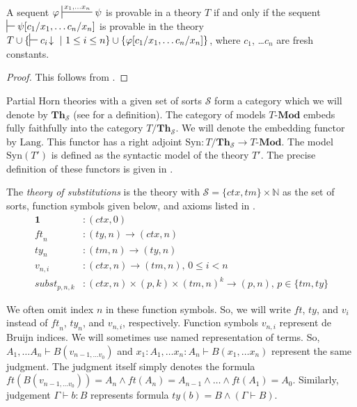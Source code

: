 \documentclass[reqno]{amsart}
\theoremstyle{definition}
\theoremstyle{remark}
\newcommand{\cat}[1]{\mathbf{#1}}
\newcommand{\Mod}[1]{#1\text{-}\cat{Mod}}
\newcommand{\Th}{\cat{Th}}
\newcommand{\emptyCtx}{\mathbf{1}}
\newcommand{\Syn}{\mathrm{Syn}}
\newcommand{\Lang}{\mathrm{Lang}}
\newcommand{\subst}{\mathit{subst}}
\newcommand{\ft}{\mathit{ft}}
\newcommand{\ty}{\mathit{ty}}
\newcommand{\ctx}{\mathit{ctx}}
\newcommand{\tm}{\mathit{tm}}
\numberwithin{figure}{section}
\begin{document}
\begin{lem}[mcf]
A sequent $\varphi \sststile{}{x_1, \ldots x_n} \psi$ is provable in a theory $T$ if and only if
the sequent $\sststile{}{} \psi[c_1/x_1, \ldots c_n/x_n]$ is provable in the theory $T \cup \{ \sststile{}{} c_i\!\downarrow\ |\ 1 \leq i \leq n \} \cup \{ \varphi[c_1/x_1, \ldots c_n/x_n] \}$,
where $c_1$, \ldots $c_n$ are fresh constants.
\end{lem}
\begin{proof}
This follows from \cite[Theorem~10, Theorem~11]{PHL}.
\end{proof}

Partial Horn theories with a given set of sorts $\mathcal{S}$ form a category which we will denote by $\Th_\mathcal{S}$ (see \cite[Section~2]{alg-tt} for a definition).
The category of models $\Mod{T}$ embeds fully faithfully into the category $T/\Th_\mathcal{S}$.
We will denote the embedding functor by $\Lang$.
This functor has a right adjoint $\Syn : T/\Th_\mathcal{S} \to \Mod{T}$.
The model $\Syn(T')$ is defined as the syntactic model of the theory $T'$.
The precise definition of these functors is given in \cite[Section~4.1]{alg-models}.

The \emph{theory of substitutions} is the theory with $\mathcal{S} = \{ \ctx, \tm \} \times \mathbb{N}$ as the set of sorts, function symbols given below, and axioms listed in \cite[Section~3.1]{alg-tt}.
\begin{align*}
\emptyCtx      & : (\ctx,0) \\
\ft_n          & : (\ty,n) \to (\ctx,n) \\
\ty_n          & : (\tm,n) \to (\ty,n) \\
v_{n,i}        & : (\ctx,n) \to (\tm,n) \text{, } 0 \leq i < n \\
\subst_{p,n,k} & : (\ctx,n) \times (p,k) \times (\tm,n)^k \to (p,n) \text{, } p \in \{ \tm, \ty \}
\end{align*}

We often omit index $n$ in these function symbols.
So, we will write $\ft$, $\ty$, and $v_i$ instead of $\ft_n$, $\ty_n$, and $v_{n,i}$, respectively.
Function symbols $v_{n,i}$ represent de Bruijn indices.
We will sometimes use named representation of terms.
So, $A_1, \ldots A_n \vdash B(v_{n-1, \ldots v_0})$ and $x_1 : A_1, \ldots x_n : A_n \vdash B(x_1, \ldots x_n)$ represent the same judgment.
The judgment itself simply denotes the formula $\ft(B(v_{n-1, \ldots v_0})) = A_n \land \ft(A_n) = A_{n-1} \land \ldots \land \ft(A_1) = A_0$.
Similarly, judgement $\Gamma \vdash b : B$ represents formula $\ty(b) = B \land (\Gamma \vdash B)$.
\end{document}
